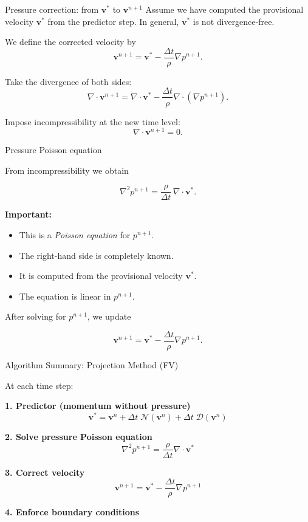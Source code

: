\documentclass[aspectratio=169]{beamer}
\begin{document}
\begin{frame}{Pressure correction: from $\mathbf{v}^*$ to $\mathbf{v}^{n+1}$}
\bigskip
Assume we have computed the provisional velocity $\mathbf{v}^*$ from the predictor step.
In general, $\mathbf{v}^*$ is not divergence-free.


We define the corrected velocity by
\[
\boxed{
\mathbf{v}^{n+1}
=
\mathbf{v}^*
-
\frac{\Delta t}{\rho}\nabla p^{n+1}.
}
\]

\bigskip
Take the divergence of both sides:
\[
\nabla\cdot\mathbf{v}^{n+1}
=
\nabla\cdot\mathbf{v}^*
-
\frac{\Delta t}{\rho}\nabla\cdot(\nabla p^{n+1}).
\]

\bigskip
Impose incompressibility at the new time level:
\[
\nabla\cdot\mathbf{v}^{n+1}=0.
\]
\end{frame}


\begin{frame}{Pressure Poisson equation}

From incompressibility we obtain

\[
\boxed{
\nabla^2 p^{n+1}
=
\frac{\rho}{\Delta t}\,\nabla\cdot\mathbf{v}^*.
}
\]

\bigskip
\textbf{Important:}

\begin{itemize}
\item This is a \emph{Poisson equation} for $p^{n+1}$.
\item The right-hand side is completely known.
\item It is computed from the provisional velocity $\mathbf{v}^*$.
\item The equation is linear in $p^{n+1}$.
\end{itemize}

\bigskip
After solving for $p^{n+1}$, we update

\[
\mathbf{v}^{n+1}
=
\mathbf{v}^*
-
\frac{\Delta t}{\rho}\nabla p^{n+1}.
\]

\end{frame}



\begin{frame}{Algorithm Summary: Projection Method (FV)}

At each time step:

\bigskip
\textbf{1. Predictor (momentum without pressure)}
\[
\mathbf{v}^* = 
\mathbf{v}^n
+ \Delta t \; \mathcal{N}(\mathbf{v}^n)
+ \Delta t \; \mathcal{D}(\mathbf{v}^n)
\]

\bigskip
\textbf{2. Solve pressure Poisson equation}
\[
\nabla^2 p^{n+1}
=
\frac{\rho}{\Delta t}\nabla\cdot\mathbf{v}^*
\]

\bigskip
\textbf{3. Correct velocity}
\[
\mathbf{v}^{n+1}
=
\mathbf{v}^*
-
\frac{\Delta t}{\rho}\nabla p^{n+1}
\]

\bigskip
\textbf{4. Enforce boundary conditions}

\end{frame}
\end{document}
